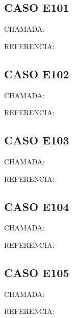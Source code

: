 \documentclass{undftex}
\begin{document}
\begin{refsection}\section*{CASO E101}\noindent CHAMADA:  \par\noindent REFERENCIA:\par\printbibliography[heading=none,check=undfconsultadas]\end{refsection}\clearpage
\begin{refsection}\section*{CASO E102}\noindent CHAMADA:  \par\noindent REFERENCIA:\par\printbibliography[heading=none,check=undfconsultadas]\end{refsection}\clearpage
\begin{refsection}\section*{CASO E103}\noindent CHAMADA:  \par\noindent REFERENCIA:\par\printbibliography[heading=none,check=undfconsultadas]\end{refsection}\clearpage
\begin{refsection}\section*{CASO E104}\noindent CHAMADA:  \par\noindent REFERENCIA:\par\printbibliography[heading=none,check=undfconsultadas]\end{refsection}\clearpage
\begin{refsection}\section*{CASO E105}\noindent CHAMADA:  \par\noindent REFERENCIA:\par\printbibliography[heading=none,check=undfconsultadas]\end{refsection}\clearpage
\end{document}
